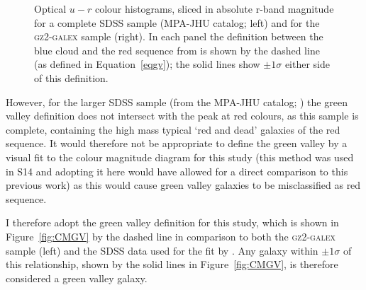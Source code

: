 \begin{figure}
\caption[Optical $u-r$ colour histograms in absolute r-band magnitude slices of the \textsc{gz2-galex} and Baldry et al. (2004) complete SDSS samples]{Optical $u-r$ colour histograms, sliced in absolute r-band magnitude for a complete SDSS sample (MPA-JHU catalog; left) and for the \textsc{gz2-galex} sample (right). In each panel the definition between the blue cloud and the red sequence from \citet{Baldry04} is shown by the dashed line (as defined in Equation~\ref{eqgv}); the solid lines show $\pm 1\sigma$ either side of this definition.}
\label{fig:cmgvsplit}
\end{figure}

However, for the larger SDSS sample (from the MPA-JHU catalog; \citealt[][left panels of Figure~\ref{fig:cmgvsplit}]{kauffmann03, brinchmann04}) the \citet{Baldry04} green valley definition does not intersect with the peak at red colours, as this sample is complete, containing the high mass typical `red and dead' galaxies of the red sequence. It would therefore not be appropriate to define the green valley by a visual fit to the colour magnitude diagram for this study (this method was used in S14 and adopting it here would have allowed for a direct comparison to this previous work) as this would cause green valley galaxies to be misclassified as red sequence.

I therefore adopt the \citet{Baldry04} green valley definition for this study, which is shown in Figure~\ref{fig:CMGV} by the dashed line in comparison to both the \textsc{gz2-galex} sample (left) and the SDSS data used for the fit by \cite[][right]{Baldry04}. Any galaxy within $\pm 1\sigma$ of this relationship, shown by the solid lines in Figure~\ref{fig:CMGV}, is therefore considered a green valley galaxy. 

